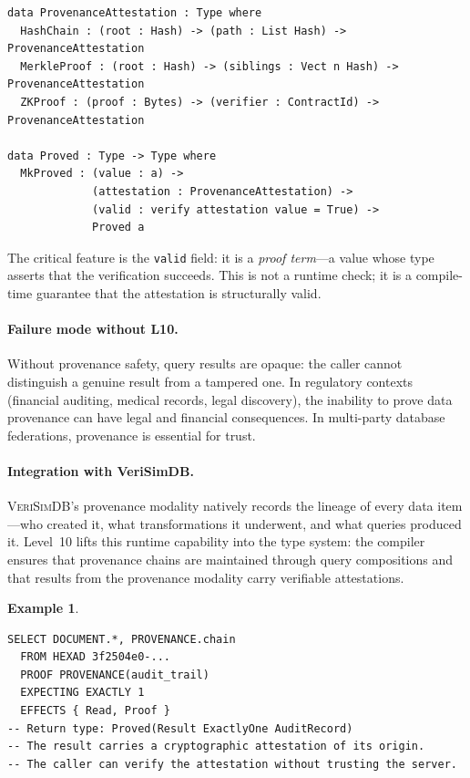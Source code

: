 \documentclass[11pt,a4paper]{article}
\newtheorem{example}[theorem]{Example}
\newcommand{\VeriSimDB}{\textsc{VeriSimDB}}
\newcommand{\LevelN}[1]{\textsf{L#1}}
\begin{document}
\begin{lstlisting}[language=Idris2]
data ProvenanceAttestation : Type where
  HashChain : (root : Hash) -> (path : List Hash) -> ProvenanceAttestation
  MerkleProof : (root : Hash) -> (siblings : Vect n Hash) -> ProvenanceAttestation
  ZKProof : (proof : Bytes) -> (verifier : ContractId) -> ProvenanceAttestation

data Proved : Type -> Type where
  MkProved : (value : a) ->
             (attestation : ProvenanceAttestation) ->
             (valid : verify attestation value = True) ->
             Proved a
\end{lstlisting}

The critical feature is the \texttt{valid} field: it is a
\emph{proof term}---a value whose type asserts that the verification
succeeds.  This is not a runtime check; it is a compile-time
guarantee that the attestation is structurally valid.

\paragraph{Failure mode without \LevelN{10}.}
Without provenance safety, query results are opaque: the caller
cannot distinguish a genuine result from a tampered one.  In
regulatory contexts (financial auditing, medical records, legal
discovery), the inability to prove data provenance can have
legal and financial consequences.  In multi-party database
federations, provenance is essential for trust.

\paragraph{Integration with VeriSimDB.}
\VeriSimDB{}'s provenance modality natively records the
lineage of every data item---who created it, what transformations
it underwent, and what queries produced it.  Level~10 lifts this
runtime capability into the type system: the compiler ensures that
provenance chains are maintained through query compositions and that
results from the provenance modality carry verifiable attestations.

\begin{example}
\begin{lstlisting}[language=VQL]
SELECT DOCUMENT.*, PROVENANCE.chain
  FROM HEXAD 3f2504e0-...
  PROOF PROVENANCE(audit_trail)
  EXPECTING EXACTLY 1
  EFFECTS { Read, Proof }
-- Return type: Proved(Result ExactlyOne AuditRecord)
-- The result carries a cryptographic attestation of its origin.
-- The caller can verify the attestation without trusting the server.
\end{lstlisting}
\end{example}
\end{document}
